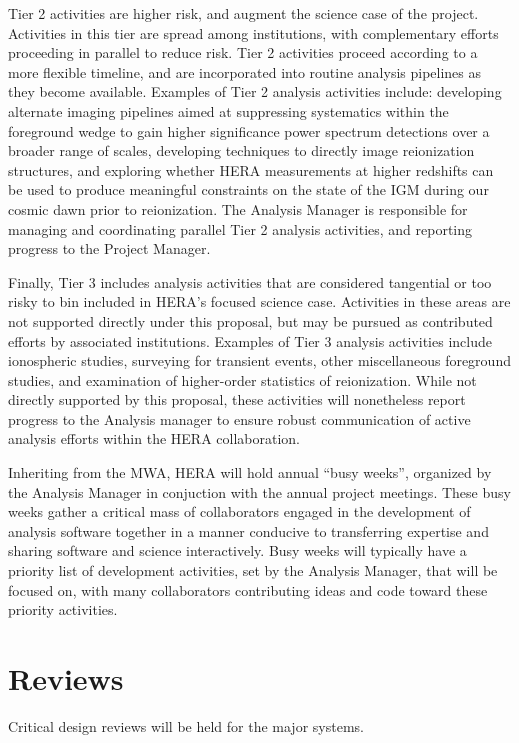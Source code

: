 \documentclass[preprint]{aastex}
\begin{document}
Tier 2 activities are higher risk, and augment the science case of the project.  Activities in
this tier are spread among institutions, with complementary efforts proceeding in parallel to
reduce risk.  Tier 2 activities proceed according to a more flexible timeline, and are incorporated
into routine analysis pipelines as they become available.  Examples of Tier 2 analysis activities
include:
developing alternate imaging pipelines aimed at suppressing systematics within the foreground wedge
to gain higher significance power spectrum detections over a broader range of scales, developing
techniques to directly image reionization structures, and exploring whether HERA measurements at
higher redshifts can be used to produce meaningful constraints on the state of the IGM during
our cosmic dawn prior to reionization.  The Analysis Manager is responsible for managing and coordinating
parallel Tier 2 analysis activities, and reporting progress to the Project Manager.

Finally, Tier 3 includes analysis activities that are considered tangential or too risky to
bin included in HERA's focused science case.
Activities in these areas are not supported directly under this proposal, but may be pursued as
contributed efforts by associated institutions.  Examples of Tier 3 analysis activities include
ionospheric studies, surveying for transient events, other miscellaneous foreground studies, and
examination of higher-order statistics of reionization.  While not directly supported by this proposal,
these activities will nonetheless report progress to the Analysis manager to ensure
robust communication of active analysis efforts within the HERA collaboration.

Inheriting from the MWA, HERA will hold annual ``busy weeks'', organized by the Analysis Manager in
conjuction with the annual project meetings.  These busy weeks gather a critical
mass of collaborators engaged in the development of analysis software together in a manner conducive to
transferring expertise and sharing software and science interactively.  Busy weeks will typically
have a priority list of development activities, set by the Analysis Manager, that will be 
focused on, with many collaborators contributing
ideas and code toward these priority activities.

\section{Reviews}
\label{sec:reviews}
Critical design reviews will be held for the major systems.
\end{document}
